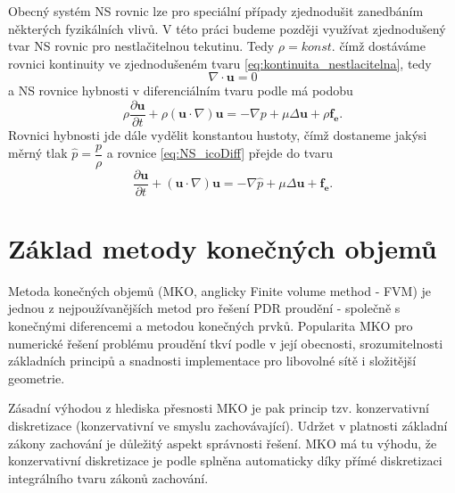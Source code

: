 Obecný systém NS rovnic lze pro speciální případy zjednodušit zanedbáním některých fyzikálních vlivů. 
V této práci budeme později využívat zjednodušený tvar NS rovnic  pro nestlačitelnou tekutinu. 
Tedy $\rho=konst.$ čímž dostáváme rovnici kontinuity ve zjednodušeném tvaru \ref{eq:kontinuita_nestlacitelna}, tedy
\begin{equation*}
\nabla\cdot\mathbf{u} = 0
\end{equation*}
a NS rovnice hybnosti v diferenciálním tvaru podle \cite{hirsch2007numerical} má podobu 
\begin{equation}\label{eq:NS_icoDiff}
\rho \dfrac{\partial \mathbf{u}}{\partial t}+ \rho(\mathbf{u}\cdot \nabla)\mathbf{u} = -\nabla p + \mu \Delta \mathbf{u} + \rho \mathbf{f_e}.
\end{equation}
Rovnici hybnosti jde dále vydělit konstantou hustoty, čímž dostaneme jakýsi měrný tlak $ \widehat{p} = \dfrac{p}{\rho} $ a rovnice \ref{eq:NS_icoDiff} přejde do tvaru
\begin{equation}\label{eq:NS_icoPseudotlak}
\dfrac{\partial \mathbf{u}}{\partial t}+ (\mathbf{u}\cdot \nabla)\mathbf{u} = -\nabla \widehat{p} + \mu \Delta \mathbf{u} + \mathbf{f_e}.
\end{equation}



\section{Základ metody konečných objemů}
Metoda konečných objemů (MKO, anglicky Finite volume method - FVM) je jednou z nejpoužívanějších metod pro řešení PDR proudění - společně s konečnými diferencemi a metodou konečných prvků. 
Popularita MKO pro numerické řešení problému proudění tkví podle \cite{hirsch2007numerical} v její obecnosti, srozumitelnosti základních principů a snadnosti implementace pro libovolné sítě i složitější geometrie.

Zásadní výhodou z hlediska přesnosti MKO je pak princip tzv. konzervativní diskretizace (konzervativní ve smyslu zachovávající). Udržet v platnosti základní zákony zachování je důležitý aspekt správnosti řešení. MKO má tu výhodu, že konzervativní diskretizace je podle \cite{hirsch2007numerical} splněna automaticky díky přímé diskretizaci integrálního tvaru zákonů zachování. 

